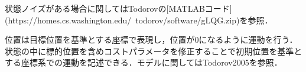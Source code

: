 状態ノイズがある場合に関してはTodorovの[MATLABコード](https://homes.cs.washington.edu/~todorov/software/gLQG.zip)を参照．

位置は目標位置を基準とする座標で表現し，位置が0になるように運動を行う．状態の中に標的位置を含めコストパラメータを修正することで初期位置を基準とする座標系での運動を記述できる．モデルに関してはTodorov2005を参照．
